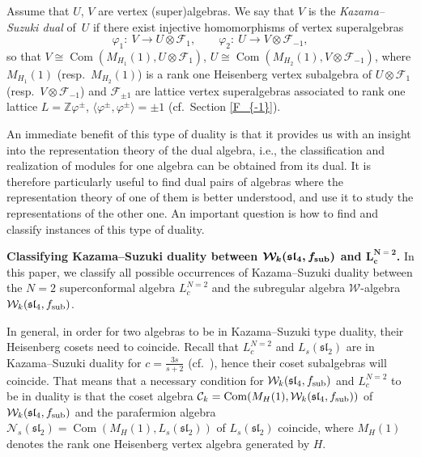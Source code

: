 \documentclass[pdftex]{sigma}
\numberwithin{equation}{section}
\newcommand{\Z}{\mathbb Z}
\newcommand{\F}{\mathcal F}
\begin{document}
Assume that $U$, $V$ are vertex (super)algebras. We say that $V$ is the \emph{Kazama--Suzuki dual} of~$U$ if there exist injective homomorphisms of vertex superalgebras
\begin{equation} \label{KSdef}
	\varphi_1 \colon\ V \rightarrow U \otimes \F_1, \qquad \varphi_2 \colon\ U \rightarrow V \otimes \F_{-1},
\end{equation}
so that
$V \cong \operatorname{Com} ( M_{H_1} (1) , U \otimes \F_1)$, $ U \cong \operatorname{Com} ( M_{H_2} (1) , V \otimes \F_{-1})$,
where $M_{H_1} (1) $ (resp.\ $ M_{H_2} (1)$) is a rank one Heisenberg vertex subalgebra of
$U\otimes \F_1$ (resp.\ $V\otimes \F_{-1}$) and $\F_{\pm 1}$ are lattice vertex superalgebras associated to rank one lattice $L= {\Z}\varphi^{\pm} $, $\big\langle \varphi^{\pm}, \varphi^{\pm} \big\rangle = \pm 1$ (cf.\ Section \ref{F_{-1}}).

An immediate benefit of this type of duality is that it provides us with an insight into the representation theory of the dual algebra, i.e., the classification and realization of modules for one algebra can be obtained from its dual. It is therefore particularly useful to find dual pairs of algebras where the representation theory of one of them is better understood, and use it to study the representations of the other one. An important question is how to find and classify instances of this type of duality.

{\bf Classifying Kazama--Suzuki duality between $\boldsymbol{\mathcal{W}_k(\mathfrak{sl}_4, f_{\rm sub})}$ and $\boldsymbol{L^{N=2}_c}$.} In this paper, we classify all possible occurrences of Kazama--Suzuki duality between the $N=2$ superconformal algebra $L^{N=2}_c$ and the subregular algebra $\mathcal{W}$-algebra $\mathcal{W}_{k}(\mathfrak{sl}_4, f_{\rm sub})$.

In general, in order for two algebras to be in Kazama--Suzuki type duality, their Heisenberg cosets need to coincide. Recall that $L^{N=2}_c$ and $L_s(\mathfrak{sl}_2)$ are in Kazama--Suzuki duality for $c =\frac{3s}{s+2}$ (cf.\ \cite{A-IMRN}), hence their coset subalgebras will coincide. That means that a necessary condition for $\mathcal{W}_k(\mathfrak{sl}_4, f_{\rm sub})$ and $L^{N=2}_c$ to be in duality is that the coset algebra $ \mathcal C_k = \operatorname{Com} (M_H(1) ,\mathcal W_k(\mathfrak{sl}_4, f_{\rm sub})) $ of $\mathcal W_k(\mathfrak{sl}_4, f_{\rm sub})$ and the parafermion algebra $ \mathcal N_s(\mathfrak{sl}_2) = \operatorname{Com} (M_H(1) , L_s(\mathfrak{sl}_2)) $ of $L_s(\mathfrak{sl}_2)$ coincide, where $M_H(1)$ denotes the rank one Heisenberg vertex algebra generated by $H$.
\end{document}
